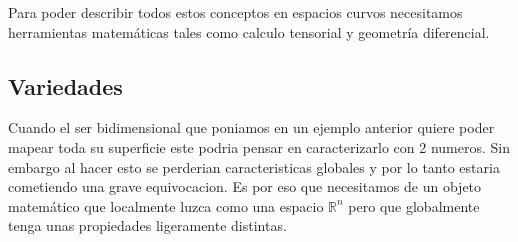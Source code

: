 \documentclass[../Main.tex]{subfiles}
\begin{document}
Para poder describir todos estos conceptos en espacios curvos necesitamos herramientas matemáticas tales como calculo tensorial y geometría diferencial.

\subsection{Variedades}
Cuando el ser bidimensional que poniamos en un ejemplo anterior quiere poder mapear toda su superficie este podria pensar en caracterizarlo con 2 numeros. Sin embargo al hacer esto se perderian caracteristicas globales y por lo tanto estaria cometiendo una grave equivocacion. Es por eso que necesitamos de un objeto matemático que localmente luzca como una espacio $\mathbb{R}^n$ pero que globalmente tenga unas propiedades ligeramente distintas.
\end{document}
